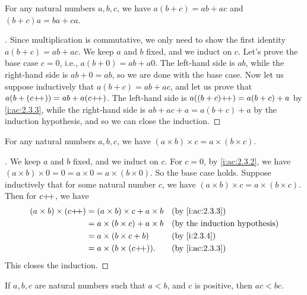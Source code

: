 \begin{prop}\label{i:2.3.4}
  For any natural numbers \(a, b, c\), we have \(a(b + c) = ab + ac\) and \((b + c)a = ba + ca\).
\end{prop}

\begin{proof}[]
  Since multiplication is commutative, we only need to show the first identity \(a(b + c) = ab + ac\).
  We keep \(a\) and \(b\) fixed, and we induct on \(c\).
  Let's prove the base case \(c = 0\), i.e., \(a(b + 0) = ab + a0\).
  The left-hand side is \(ab\), while the right-hand side is \(ab + 0 = ab\), so we are done with the base case.
  Now let us suppose inductively that \(a(b + c) = ab + ac\), and let us prove that \(a(b + (c{+}\!{+})) = ab + a(c{+}\!{+})\).
  The left-hand side is \(a((b + c){+}\!{+}) = a(b + c) + a\) by \cref{i:ac:2.3.3}, while the right-hand side is \(ab + ac + a = a(b + c) + a\) by the induction hypothesis, and so we can close the induction.
\end{proof}

\begin{prop}\label{i:2.3.5}
  For any natural numbers \(a, b, c\), we have \((a \times b) \times c = a \times (b \times c)\).
\end{prop}

\begin{proof}[]
  We keep \(a\) and \(b\) fixed, and we induct on \(c\).
  For \(c = 0\), by \cref{i:ac:2.3.2}, we have \((a \times b) \times 0 = 0 = a \times 0 = a \times (b \times 0)\).
  So the base case holds.
  Suppose inductively that for some natural number \(c\), we have \((a \times b) \times c = a \times (b \times c)\).
  Then for \(c{+}\!{+}\), we have
  \begin{align*}
    (a \times b) \times (c\pp) & = (a \times b) \times c + a \times b &  & \by{i:ac:2.3.3} \\
                               & = a \times (b \times c) + a \times b &  & \byIH           \\
                               & = a \times (b \times c + b)          &  & \by{i:2.3.4}    \\
                               & = a \times (b \times (c\pp)).        &  & \by{i:ac:2.3.3}
  \end{align*}
  This closes the induction.
\end{proof}

\begin{prop}\label{i:2.3.6}
  If \(a, b, c\) are natural numbers such that \(a < b\), and \(c\) is positive, then \(ac < bc\).
\end{prop}

